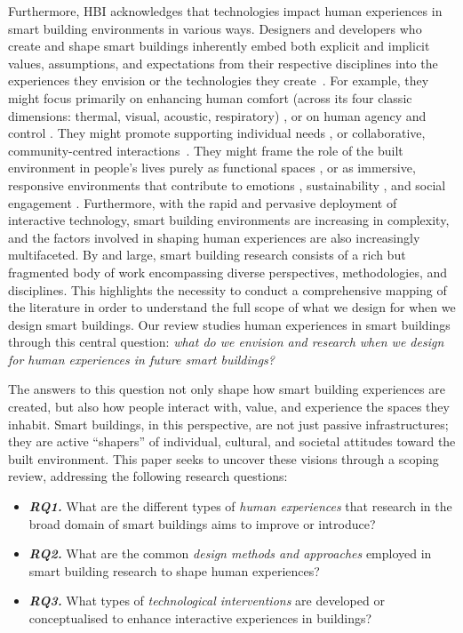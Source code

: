 Furthermore, HBI acknowledges that technologies impact human experiences in smart building environments in various ways. Designers and developers who create and shape smart buildings inherently embed both explicit and implicit values, assumptions, and expectations from their respective disciplines into the experiences they envision or the technologies they create~\cite{wiberg2020interaction}. For example, they might focus primarily on enhancing human comfort (across its four classic dimensions: thermal, visual, acoustic, respiratory) \cite{alavi2017comfort}, or on human agency and control \cite{brambilla2017our}.
They might promote supporting individual needs \cite{baillie2008place}, or collaborative, community-centred interactions~\cite{jacobsen2023living}. They might frame the role of the built environment in people's lives purely as functional spaces \cite{yang2014making}, or as immersive, responsive environments that contribute to emotions \cite{mcdonald2015nature}, sustainability \cite{loh2010please}, and social engagement \cite{schuricht2007freequent}. Furthermore, with the rapid and pervasive deployment of interactive technology, smart building environments are increasing in complexity, and the factors involved in shaping human experiences are also increasingly multifaceted. By and large, smart building research consists of a rich but fragmented body of work encompassing diverse perspectives, methodologies, and disciplines. This highlights the necessity to conduct a comprehensive mapping of the literature in order to understand the full scope of what we design for when we design smart buildings. Our review studies human experiences in smart buildings through this central question: \textit{what do we envision and research when we design for human experiences in future smart buildings?} 

The answers to this question not only shape how smart building experiences are created, but also how people interact with, value, and experience the spaces they inhabit. Smart buildings, in this perspective, are not just passive infrastructures; they are active ``shapers'' of individual, cultural, and societal attitudes toward the built environment. This paper seeks to uncover these visions through a scoping review, addressing the following research questions:
\begin{itemize}
    \item \textbf{\textit{RQ1.}} What are the different types of \emph{human experiences} that research in the broad domain of smart buildings aims to improve or introduce?
    \item \textbf{\textit{RQ2.}} What are the common \emph{design methods and approaches} employed in smart building research to shape human experiences? 
    \item \textbf{\textit{RQ3.}} What types of \emph{technological interventions} are developed or conceptualised to enhance interactive experiences in buildings?
\end{itemize}



